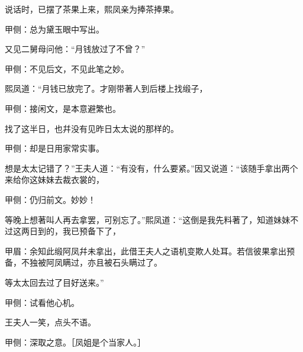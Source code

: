 \begin{parag}
    说话时，已摆了茶果上来，熙凤亲为捧茶捧果。\begin{note}甲侧：总为黛玉眼中写出。\end{note}又见二舅母问他：“月钱放过了不曾？”\begin{note}甲侧：不见后文，不见此笔之妙。\end{note}熙凤道：“月钱已放完了。才刚带著人到后楼上找缎子，\begin{note}甲侧：接闲文，是本意避繁也。\end{note}找了这半日，也幷没有见昨日太太说的那样的。\begin{note}甲侧：却是日用家常实事。\end{note}想是太太记错了？”王夫人道：“有没有，什么要紧。”因又说道：“该随手拿出两个来给你这妹妹去裁衣裳的，\begin{note}甲侧：仍归前文。妙妙！\end{note}等晚上想著叫人再去拿罢，可别忘了。”熙凤道：“这倒是我先料著了，知道妹妹不过这两日到的，我已预备下了，\begin{note}甲眉：余知此缎阿凤幷未拿出，此借王夫人之语机变欺人处耳。若信彼果拿出预备，不独被阿凤瞒过，亦且被石头瞒过了。\end{note}等太太回去过了目好送来。”\begin{note}甲侧：试看他心机。\end{note}王夫人一笑，点头不语。\begin{note}甲侧：深取之意。［凤姐是个当家人。］\end{note}
\end{parag}



